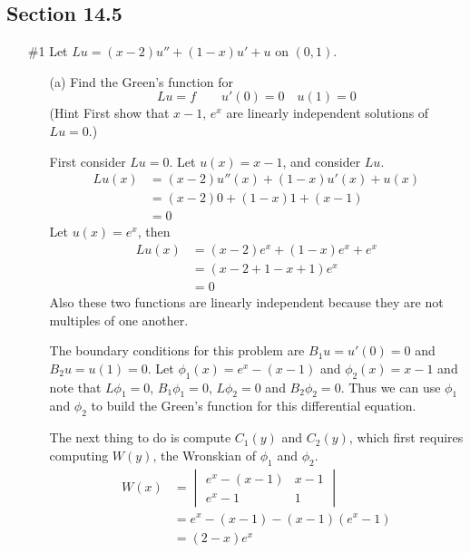 \documentclass[11pt, oneside]{article}
\begin{document}
\subsection*{Section 14.5}
\begin{enumerate}
  \item[\#1]
    Let $Lu = (x - 2)u'' + (1 - x)u' + u$ on $(0, 1)$.
    \begin{enumerate}
      \item[(a)] %
        Find the Green's function for
        \[
          Lu = f \qquad u'(0) = 0 \quad u(1) = 0
        \]
        (Hint First show that $x - 1$, $e^x$ are linearly independent
        solutions of $Lu = 0$.)

        First consider $Lu = 0$.
        Let $u(x) = x - 1$, and consider $Lu$.
        \begin{align*}
          Lu(x) &= (x - 2)u''(x) + (1 - x)u'(x) + u(x) \\
          &= (x - 2)0 + (1 - x)1 + (x - 1) \\
          &= 0
        \end{align*}
        Let $u(x) = e^x$, then
        \begin{align*}
          Lu(x) &= (x - 2)e^x + (1 - x)e^x + e^x \\
          &= (x - 2 + 1 - x + 1)e^x \\
          &= 0
        \end{align*}
        Also these two functions are linearly independent because they are not
        multiples of one another.

        The boundary conditions for this problem are $B_1 u = u'(0) = 0$ and
        $B_2 u = u(1) = 0$.
        Let $\phi_1(x) = e^x - (x - 1)$ and $\phi_2(x) = x - 1$ and note that
        $L\phi_1 = 0$, $B_1 \phi_1 = 0$, $L\phi_2 = 0$ and $B_2 \phi_2 = 0$.
        Thus we can use $\phi_1$ and $\phi_2$ to build the Green's function for
        this differential equation.

        The next thing to do is compute $C_1(y)$ and $C_2(y)$, which first
        requires computing $W(y)$, the Wronskian of $\phi_1$ and $\phi_2$.
        \begin{align*}
          W(x) &=
          \begin{vmatrix}
            e^x - (x - 1) & x - 1 \\
            e^x - 1 & 1
          \end{vmatrix} \\
          &= e^x - (x - 1) - (x - 1)(e^x - 1) \\
          &= (2 - x)e^x
        \end{align*}


\end{enumerate}
\end{enumerate}
\end{document}
